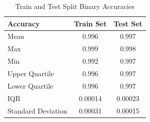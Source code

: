\documentclass[11pt]{article}
\begin{document}
\begin{table}[ht]
    \centering
    \begin{tabular}{lcc}
    \toprule
    \textbf{Accuracy}                 & \textbf{Train Set} & \textbf{Test Set}   \\
    \midrule
    Mean       & 0.996      & 0.997      \\
    Max         & 0.999      & 0.998      \\
    Min        & 0.992      & 0.997      \\
    Upper Quartile       & 0.996      & 0.997      \\
    Lower Quartile       & 0.996      & 0.997      \\
    IQR                  & 0.00014    & 0.00023    \\
    Standard Deviation   & 0.00031    & 0.00015    \\
    \bottomrule
    \end{tabular}
    \caption{Train and Test Split Binary Accuracies}

    \label{tab:accuracy_summary}
    \end{table}
    
\end{document}
